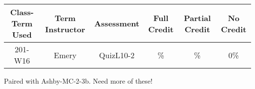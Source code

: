 \begin{outcomes}
	\begin{center}
		\begin{tabular}{ccc|ccc}
			\hline\hline
			Class-Term Used & Term Instructor & Assessment & Full Credit & Partial Credit & No Credit\\
			\hline
			201-W16 & Emery & QuizL10-2 & \% & \% & 0\%\\    %
		\end{tabular}
	\end{center}
\end{outcomes}

\begin{comments}

Paired with Ashby-MC-2-3b. Need more of these!

\end{comments}